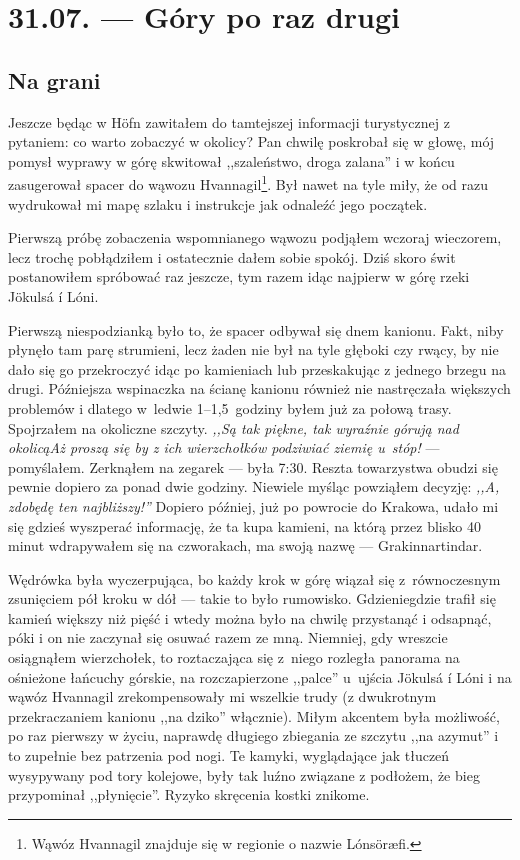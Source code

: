 \chapter*{31.07. --- Góry po raz drugi}

\section*{Na grani}

Jeszcze będąc w Höfn zawitałem do tamtejszej informacji turystycznej z pytaniem: co warto zobaczyć w okolicy? Pan chwilę poskrobał się w głowę, mój pomysł wyprawy w górę  skwitował ,,szaleństwo, droga zalana'' i w końcu zasugerował spacer do wąwozu Hvannagil\footnote{Wąwóz Hvannagil znajduje się w regionie o nazwie Lónsöræfi.}. Był nawet na tyle miły, że od razu wydrukował mi mapę szlaku i instrukcje jak odnaleźć jego początek.

Pierwszą próbę zobaczenia wspomnianego wąwozu podjąłem wczoraj wieczorem, lecz trochę pobłądziłem i ostatecznie dałem sobie spokój. Dziś skoro świt postanowiłem spróbować raz jeszcze, tym razem idąc najpierw w górę rzeki Jökulsá í Lóni.

Pierwszą niespodzianką było to, że spacer odbywał się dnem kanionu. Fakt, niby płynęło tam parę strumieni, lecz żaden nie był na tyle głęboki czy rwący, by nie dało się go przekroczyć idąc po kamieniach lub przeskakując z jednego brzegu na drugi. Późniejsza wspinaczka na ścianę kanionu również nie nastręczała większych problemów i dlatego w~ledwie \mbox{1--1,5 godziny} byłem już za połową trasy. Spojrzałem na okoliczne szczyty. \emph{,,Są tak piękne, tak wyraźnie górują nad okolicą\textellipsis Aż proszą się by z ich wierzchołków podziwiać ziemię u~stóp!} --- pomyślałem. Zerknąłem na zegarek --- była 7:30. Reszta towarzystwa obudzi się pewnie dopiero za ponad dwie godziny. Niewiele myśląc powziąłem decyzję: \emph{,,A, zdobędę ten najbliższy!''} Dopiero później, już po powrocie do Krakowa, udało mi się gdzieś wyszperać informację, że ta kupa kamieni, na którą przez blisko 40 minut wdrapywałem się na czworakach, ma swoją nazwę --- Grakinnartindar.

Wędrówka była wyczerpująca, bo każdy krok w górę wiązał się z~równoczesnym zsunięciem pół kroku w dół --- takie to było rumowisko. Gdzieniegdzie trafił się kamień większy niż pięść i wtedy można było na chwilę przystanąć i odsapnąć, póki i on nie zaczynał się osuwać razem ze mną. Niemniej, gdy wreszcie osiągnąłem wierzchołek, to roztaczająca się z~niego rozległa panorama na ośnieżone łańcuchy górskie, na rozczapierzone ,,palce'' u~ujścia Jökulsá í Lóni i na wąwóz Hvannagil zrekompensowały mi wszelkie trudy (z dwukrotnym przekraczaniem kanionu ,,na dziko'' włącznie). Miłym akcentem była możliwość, po raz pierwszy w życiu, naprawdę długiego zbiegania ze szczytu ,,na azymut'' i to zupełnie bez patrzenia pod nogi. Te kamyki, wyglądające jak tłuczeń wysypywany pod tory kolejowe, były tak luźno związane z podłożem, że bieg przypominał ,,płynięcie''. Ryzyko skręcenia kostki znikome.

